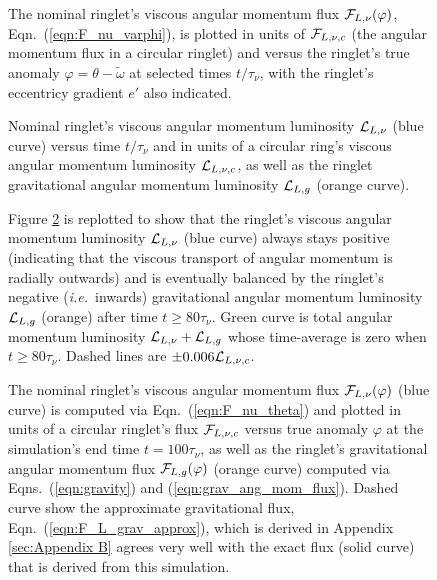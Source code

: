 \documentclass[preprint]{aastex62}
\begin{document}
\begin{figure}
    \caption{
        \label{fig:F_nu_nominal}
        The nominal ringlet's viscous angular momentum flux ${\cal F}_{L,\nu}(\varphi)$,
        Eqn.\ (\ref{eqn:F_nu_varphi}), is plotted 
        in units of ${\cal F}_{L,\nu,c}$ (the angular momentum flux in a circular ringlet)
        and versus the ringlet's
        true anomaly $\varphi=\theta-\tilde{\omega}$ at selected times $t/\tau_\nu$, 
        with the ringlet's eccentricy gradient $e'$ also indicated.
    }
\end{figure}

\begin{figure}
    \caption{
        \label{fig:angular_momentum_luminosity_nominal}
        Nominal ringlet's viscous angular momentum luminosity ${\cal L}_{L,\nu}$ (blue curve) versus time $t/\tau_\nu$
        and in units of a circular ring's viscous angular momentum luminosity ${\cal L}_{L,\nu,c}$, 
        as well as the ringlet gravitational angular momentum luminosity ${\cal L}_{L,g}$ (orange curve).
    }
\end{figure}

\begin{figure}
    \caption{
        \label{fig:angular_momentum_luminosity_zoom_nominal}
        Figure \ref{fig:angular_momentum_luminosity_nominal} is replotted to show that the ringlet's 
        viscous angular momentum luminosity ${\cal L}_{L,\nu}$ (blue curve)
        always stays positive (indicating that the viscous transport of angular momentum is radially outwards)
        and is eventually balanced by the ringlet's negative ({\it i.e.}\ inwards) gravitational angular momentum luminosity 
        ${\cal L}_{L,g}$ (orange) after time $t\ge 80\tau_\nu$. Green curve is total angular momentum luminosity 
        ${\cal L}_{L,\nu} + {\cal L}_{L,g}$ whose time-average is zero when $t\ge 80\tau_\nu$.
        Dashed lines are $\pm0.006{\cal L}_{L,\nu,c}$.
    }
\end{figure}

\begin{figure}
    \caption{
        \label{fig:F_vs_longitude_nominal}
        The nominal ringlet's viscous angular momentum flux ${\cal F}_{L,\nu}(\varphi)$ (blue curve) is computed
        via Eqn.\ (\ref{eqn:F_nu_theta}) and plotted in units of a circular ringlet's flux ${\cal F}_{L,\nu,c}$
        versus true anomaly $\varphi$ at the simulation's end time $t=100\tau_\nu$, 
        as well as the ringlet's gravitational angular momentum flux ${\cal F}_{L,g}(\varphi)$
        (orange curve) computed via Eqns.\ (\ref{eqn:gravity}) and (\ref{eqn:grav_ang_mom_flux}).
        Dashed curve show the approximate gravitational flux, 
        Eqn.\ (\ref{eqn:F_L_grav_approx}), which is derived in Appendix \ref{sec:Appendix B} 
        agrees very well with the exact flux (solid curve) 
        that is derived from this simulation.
    }
\end{figure}
\end{document}
